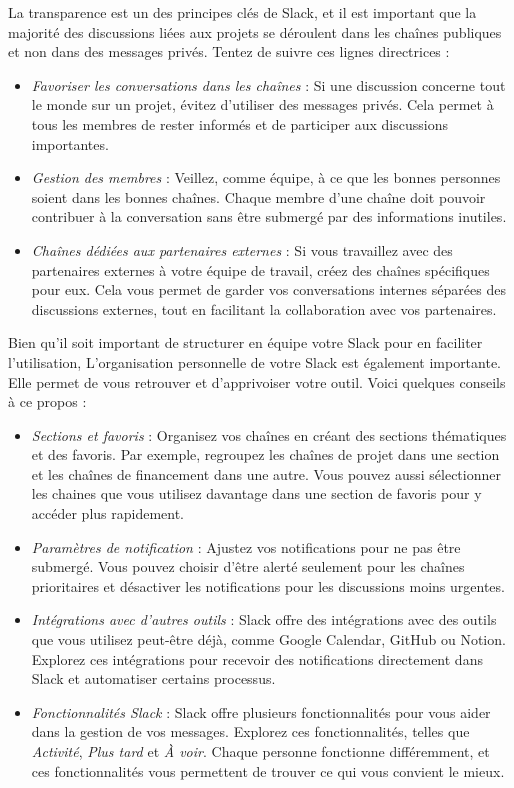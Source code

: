 \documentclass[
  letterpaper,
  DIV=11,
  numbers=noendperiod]{scrreprt}
\begin{document}
La transparence est un des principes clés de Slack, et il est important
que la majorité des discussions liées aux projets se déroulent dans les
chaînes publiques et non dans des messages privés. Tentez de suivre ces
lignes directrices :

\begin{itemize}
\item
  \emph{Favoriser les conversations dans les chaînes} : Si une
  discussion concerne tout le monde sur un projet, évitez d'utiliser des
  messages privés. Cela permet à tous les membres de rester informés et
  de participer aux discussions importantes.
\item
  \emph{Gestion des membres} : Veillez, comme équipe, à ce que les
  bonnes personnes soient dans les bonnes chaînes. Chaque membre d'une
  chaîne doit pouvoir contribuer à la conversation sans être submergé
  par des informations inutiles.
\item
  \emph{Chaînes dédiées aux partenaires externes} : Si vous travaillez
  avec des partenaires externes à votre équipe de travail, créez des
  chaînes spécifiques pour eux. Cela vous permet de garder vos
  conversations internes séparées des discussions externes, tout en
  facilitant la collaboration avec vos partenaires.
\end{itemize}

Bien qu'il soit important de structurer en équipe votre Slack pour en
faciliter l'utilisation, L'organisation personnelle de votre Slack est
également importante. Elle permet de vous retrouver et d'apprivoiser
votre outil. Voici quelques conseils à ce propos :

\begin{itemize}
\item
  \emph{Sections et favoris} : Organisez vos chaînes en créant des
  sections thématiques et des favoris. Par exemple, regroupez les
  chaînes de projet dans une section et les chaînes de financement dans
  une autre. Vous pouvez aussi sélectionner les chaines que vous
  utilisez davantage dans une section de favoris pour y accéder plus
  rapidement.
\item
  \emph{Paramètres de notification} : Ajustez vos notifications pour ne
  pas être submergé. Vous pouvez choisir d'être alerté seulement pour
  les chaînes prioritaires et désactiver les notifications pour les
  discussions moins urgentes.
\item
  \emph{Intégrations avec d'autres outils} : Slack offre des
  intégrations avec des outils que vous utilisez peut-être déjà, comme
  Google Calendar, GitHub ou Notion. Explorez ces intégrations pour
  recevoir des notifications directement dans Slack et automatiser
  certains processus.
\item
  \emph{Fonctionnalités Slack} : Slack offre plusieurs fonctionnalités
  pour vous aider dans la gestion de vos messages. Explorez ces
  fonctionnalités, telles que \emph{Activité}, \emph{Plus tard} et
  \emph{À voir}. Chaque personne fonctionne différemment, et ces
  fonctionnalités vous permettent de trouver ce qui vous convient le
  mieux.
\end{itemize}
\end{document}
